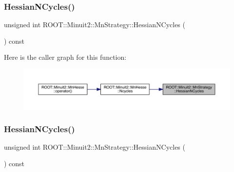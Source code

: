 \subsubsection{\texorpdfstring{HessianNCycles()}{HessianNCycles()}\hspace{0.1cm}{\footnotesize\ttfamily [1/2]}}
{\footnotesize\ttfamily unsigned int R\+O\+O\+T\+::\+Minuit2\+::\+Mn\+Strategy\+::\+Hessian\+N\+Cycles (\begin{DoxyParamCaption}{ }\end{DoxyParamCaption}) const\hspace{0.3cm}{\ttfamily [inline]}}

Here is the caller graph for this function\+:\nopagebreak
\begin{figure}[H]
\begin{center}
\leavevmode
\includegraphics[width=350pt]{da/de4/classROOT_1_1Minuit2_1_1MnStrategy_ab2342c7f4896a8ed08c9df93fca93066_icgraph}
\end{center}
\end{figure}
\mbox{\label{classROOT_1_1Minuit2_1_1MnStrategy_ab2342c7f4896a8ed08c9df93fca93066}} 
\subsubsection{\texorpdfstring{HessianNCycles()}{HessianNCycles()}\hspace{0.1cm}{\footnotesize\ttfamily [2/2]}}
{\footnotesize\ttfamily unsigned int R\+O\+O\+T\+::\+Minuit2\+::\+Mn\+Strategy\+::\+Hessian\+N\+Cycles (\begin{DoxyParamCaption}{ }\end{DoxyParamCaption}) const\hspace{0.3cm}{\ttfamily [inline]}}

\mbox{\label{classROOT_1_1Minuit2_1_1MnStrategy_aaee4b3cbe14d4caa2d57fbc93b451ac2}} 

